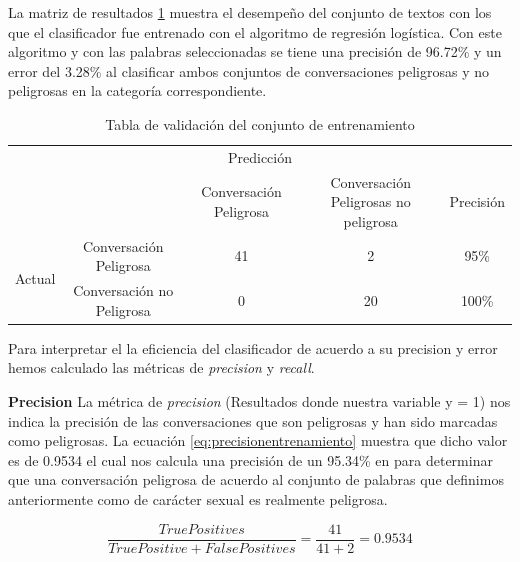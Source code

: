 La matriz de resultados \ref{tab:confucion2} muestra el desempe\~no del conjunto de textos con los que el clasificador fue entrenado con el algoritmo de regresi\'on log\'istica. Con este algoritmo y con las palabras seleccionadas se tiene una precisi\'on de 96.72\% y un error del 3.28\% al clasificar ambos conjuntos de conversaciones peligrosas y no peligrosas en la categor\'ia correspondiente. 

\begin{table}[h]
\begin{center}
\begin{tabular}{c|c|c|c|c|}
\multicolumn{5}{c}{Predicci\'on} \\
\cline{2-5}
& & Conversaci\'on Peligrosa & Conversaci\'on Peligrosas no peligrosa&  Precisi\'on \\
\cline{2-5}
\multirow{2}{*}{Actual} & Conversaci\'on Peligrosa & 41 & 2 & 95\% \\
\cline{2-5}
& Conversaci\'on no  Peligrosa &  0 & 20 & 100\% \\
\cline{2-5}

\end{tabular}
\caption{Tabla de validaci\'on del conjunto de entrenamiento}
\label{tab:confucion2}
\end{center}
\end{table}


Para interpretar el la eficiencia del clasificador de acuerdo a su precision y error hemos calculado las m\'etricas de \textit{precision} y \textit{recall}.


\textbf{Precision} \linebreak
La m\'etrica de \textit{precision} (Resultados donde nuestra variable y = 1) nos indica la precisi\'on de las conversaciones que son peligrosas y han sido marcadas como peligrosas. La ecuaci\'on \ref{eq:precisionentrenamiento} muestra que dicho valor es de 0.9534 el cual nos calcula una precisi\'on de un 95.34\% en para determinar que una conversaci\'on peligrosa de acuerdo al conjunto de palabras que definimos anteriormente como de car\'acter sexual es realmente peligrosa.

\begin{equation}\label{eq:precisionentrenamiento}
\frac{TruePositives}{TruePositive + FalsePositives} = \frac{41}{41+2} = 0.9534
\end{equation}

